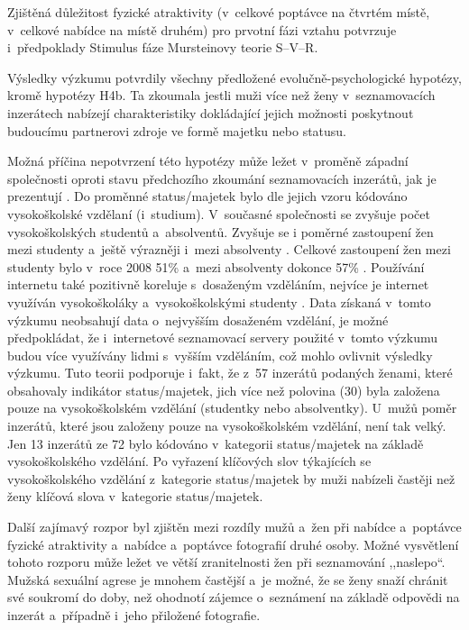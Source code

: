 \documentclass[a4paper, 12pt, notitlepage, oneside, numbers=noenddot]{report}
\begin{document}
Zjištěná důležitost fyzické atraktivity (v~celkové poptávce na čtvrtém
místě, v~celkové nabídce na místě druhém) pro prvotní fázi vztahu
potvrzuje i~předpoklady Stimulus fáze Mursteinovy
\citeyearpar{Murstein1970} teorie S--V--R.

Výsledky výzkumu potvrdily všechny předložené evolučně-psychologické
hypotézy, kromě hypotézy H4b.  Ta zkoumala jestli muži více než ženy
v~seznamovacích inzerátech nabízejí charakteristiky dokládající jejich
možnosti poskytnout budoucímu partnerovi zdroje ve formě majetku nebo
statusu.

Možná příčina nepotvrzení této hypotézy může ležet v~proměně západní
společnosti oproti stavu předchozího zkoumání seznamovacích inzerátů,
jak je prezentují \citet{BarrettDunbarLycett2007}.  Do proměnné
status/majetek bylo dle jejich vzoru kódováno vysokoškolské vzdělaní
(i~studium).  V~současné společnosti se zvyšuje počet vysokoškolských
studentů a~absolventů.  Zvyšuje se i poměrné zastoupení žen mezi
studenty a~ještě výrazněji i~mezi absolventy \citep{CSU2010}.  Celkové
zastoupení žen mezi studenty bylo v~roce 2008 51\% a~mezi absolventy
dokonce 57\% \citep{CSU2010}.  Používání internetu také pozitivně
koreluje s~dosaženým vzděláním, nejvíce je internet využíván
vysokoškoláky a~vysokoškolskými studenty \citep{GalaczSmahel2007}.
Data získaná v~tomto výzkumu neobsahují data o~nejvyšším dosaženém
vzdělání, je možné předpokládat, že i~internetové seznamovací servery
použité v~tomto výzkumu budou více využívány lidmi s~vyšším vzděláním,
což mohlo ovlivnit výsledky výzkumu.  Tuto teorii podporuje i~fakt, že
z~57 inzerátů podaných ženami, které obsahovaly indikátor
status/majetek, jich více než polovina (30) byla založena pouze na
vysokoškolském vzdělání (studentky nebo absolventky).  U~mužů poměr
inzerátů, které jsou založeny pouze na vysokoškolském vzdělání, není
tak velký.  Jen 13 inzerátů ze 72 bylo kódováno v~kategorii
status/majetek na základě vysokoškolského vzdělání.  Po vyřazení
klíčových slov týkajících se vysokoškolského vzdělání z~kategorie
status/majetek by muži nabízeli častěji než ženy klíčová slova
v~kategorie status/majetek.

Další zajímavý rozpor byl zjištěn mezi rozdíly mužů a~žen při nabídce
a~poptávce fyzické atraktivity a~nabídce a~poptávce fotografií druhé
osoby.  Možné vysvětlení tohoto rozporu může ležet ve větší
zranitelnosti žen při seznamování ,,naslepo``. Mužská sexuální agrese
je mnohem častější a~je možné, že se ženy snaží chránit své soukromí
do doby, než ohodnotí zájemce o~seznámení na základě odpovědi na
inzerát a~případně i~jeho přiložené fotografie.
\end{document}

